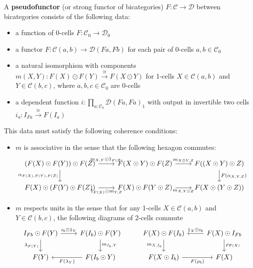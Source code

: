 \begin{defn}{}
    A \textbf{pseudofunctor} (or strong functor of bicategories) $F:\mathcal{C}\rightarrow \mathcal{D}$ between bicategories consists of the following data:
    \begin{itemize}
        \item a function of 0-cells $F:\mathcal{C}_0\rightarrow \mathcal{D}_0$
        \item a functor $F:\mathcal{C}(a,b)\rightarrow \mathcal{D}(Fa,Fb)$ for each pair of $0$-cells $a,b \in \mathcal{C}_0$
        \item a natural isomorphism with components $m(X,Y):F(X)\odot F(Y)\xrightarrow{\cong}F(X\odot Y)$ for 1-cells $X \in \mathcal{C}(a,b)$ and $Y \in \mathcal{C}(b,c)$, where $a,b,c \in \mathcal{C}_0$ are 0-cells
        \item a dependent function $i:\prod_{a : \mathcal{C}_0}\mathcal{D}(Fa,Fa)_1$ with output in invertible two cells $i_a:I_{Fa}\xrightarrow{\cong}F(I_a)$
    \end{itemize}
    This data must satisfy the following coherence conditions:
    \begin{itemize}
        \item $m$ is associative in the sense that the following hexagon commutes:
        \[\begin{tikzcd}
        	{(F(X)\odot F(Y))\odot F(Z)} & {F(X\odot Y)\odot F(Z)} & {F((X\odot Y)\odot Z)} \\
        	{F(X)\odot (F(Y)\odot F(Z))} & {F(X)\odot F(Y\odot Z)} & {F(X\odot (Y\odot Z))}
        	\arrow["{m_{X,Y}\odot 1_{F(Z)}}", from=1-1, to=1-2]
        	\arrow["{m_{X\odot Y,Z}}", from=1-2, to=1-3]
        	\arrow["{F(\alpha_{X,Y,Z})}", from=1-3, to=2-3]
        	\arrow["{\alpha_{F(X),F(Y),F(Z)}}"', from=1-1, to=2-1]
        	\arrow["{1_{F(X)}\odot m_{Y,Z}}"', from=2-1, to=2-2]
        	\arrow["{m_{X,Y\odot Z}}"', from=2-2, to=2-3]
        \end{tikzcd}\]
        \item $m$ respects units in the sense that for any 1-cells $X \in \mathcal{C}(a,b)$ and $Y \in \mathcal{C}(b,c)$, the following diagrams of 2-cells commute
        \[\begin{tikzcd}
        	{I_{Fb}\odot F(Y)} & {F(I_b)\odot F(Y)} & {F(X)\odot F(I_b)} & {F(X)\odot I_{Fb}} \\
        	{F(Y)} & {F(I_b\odot Y)} & {F(X\odot I_b)} & {F(X)}
        	\arrow["{\lambda_{F(Y)}}"', from=1-1, to=2-1]
        	\arrow["{i_b\odot 1_Y}", from=1-1, to=1-2]
        	\arrow["{m_{I_b,Y}}", from=1-2, to=2-2]
        	\arrow["{F(\lambda_Y)}", from=2-2, to=2-1]
        	\arrow["{\rho_{F(X)}}", from=1-4, to=2-4]
        	\arrow["{1_X\odot i_b}"', from=1-4, to=1-3]
        	\arrow["{m_{X,I_b}}"', from=1-3, to=2-3]
        	\arrow["{F(\rho_b)}"', from=2-3, to=2-4]
        \end{tikzcd}\]
    \end{itemize}
\end{defn}

